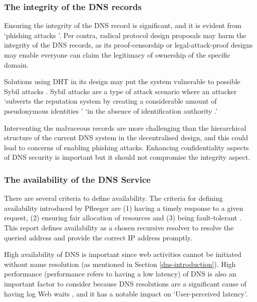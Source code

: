 \subsubsection{The integrity of the DNS records}
Ensuring the integrity of the DNS record is significant, and it is evident from `phishing attacks \cite{ariyapperuma2007security, ollmann2004phishing}'.
Per contra, radical protocol design proposals may harm the integrity of the DNS records, as its proof-censorship or legal-attack-proof designs may enable everyone can claim the legitimacy of ownership of the specific domain.

Solutions using DHT in its design may put the system vulnerable to possible Sybil attacks \cite{6503215, SitE2002Scfp}.
Sybil attacks are a type of attack scenario where an attacker `subverts the reputation system by creating a considerable amount of pseudonymous identities \cite{TRIFA20141135}' `in the absence of identification authority \cite{douceur2002sybil}.'

Interventing the malvaceous records are more challenging than the hierarchical structure of the current DNS system in the decentralised design, and this could lead to concerns of enabling phishing attacks.
Enhancing confidentiality aspects of DNS security is important but it should not compromise the integrity aspect.

\subsubsection{The availability of the DNS Service}
There are several criteria to define availability. The criteria for defining availability introduced by Pfleeger are (1) having a timely response to a given request, (2) ensuring fair allocation of resources and (3) being fault-tolerant \cite{securityincomputing}.
This report defines availability as a chosen recursive resolver to resolve the queried address and provide the correct IP address promptly.

High availability of DNS is important since web activities cannot be initiated without name resolution (as mentioned in Section \ref{dns-introduction}). High performance (performance refers to having a low latency) of DNS is also an important factor to consider because DNS resolutions are a significant cause of having log Web waits \cite{cohen2003proactive, jung2002dns}, and it has a notable impact on `User-perceived latency'.